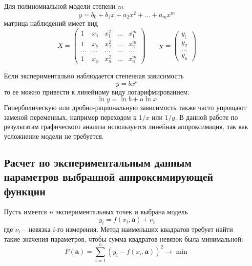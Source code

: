 \documentclass[12pt,a4paper]{article}
\begin{document}
Для полиномиальной модели степени $m$
\begin{equation*}
y = b_0 + b_1x + a_2x^2 + \ldots + a_mx^m
\end{equation*}
матрица наблюдений имеет вид
\begin{equation*}
X =
\begin{pmatrix}
1 & x_1 & x_1^2 & \ldots & x_1^m\\
1 & x_2 & x_2^2 & \ldots & x_2^m\\
\ldots & \ldots & \ldots & \ldots & \ldots\\
1 & x_n & x_n^2 & \ldots & x_n^m
\end{pmatrix}
\qquad
\mathbf{y} =
\begin{pmatrix}
y_1\\y_2\\\ldots\\y_n
\end{pmatrix}
\end{equation*}

Если экспериментально наблюдается степенная зависимость
\begin{equation*}
y = bx^a
\end{equation*}
то ее можно привести к линейному виду логарифмированием:
\begin{equation*}
\ln y = \ln b + a\ln x
\end{equation*}
Гиперболическую или дробно-рациональную зависимость также часто упрощают
заменой переменных, например переходом к $1/x$ или $1/y$.
В данной работе по результатам графического анализа используется линейная
аппроксимация, так как усложнение модели не требуется.

\subsection{Расчет по экспериментальным данным параметров
выбранной аппроксимирующей функции}

Пусть имеется $n$ экспериментальных точек и выбрана модель
\begin{equation*}
y_i = f(x_i, \mathbf{a}) + \nu_i
\end{equation*}
где $\nu_i$ – невязка $i$-го измерения. Метод наименьших квадратов требует
найти такие значения параметров, чтобы сумма квадратов невязок была минимальной:
\begin{equation*}
F(\mathbf{a}) = \sum\limits_{i = 1}^{n}\left(y_i - f(x_i, \mathbf{a})\right)^2 \rightarrow \min
\end{equation*}
\end{document}
